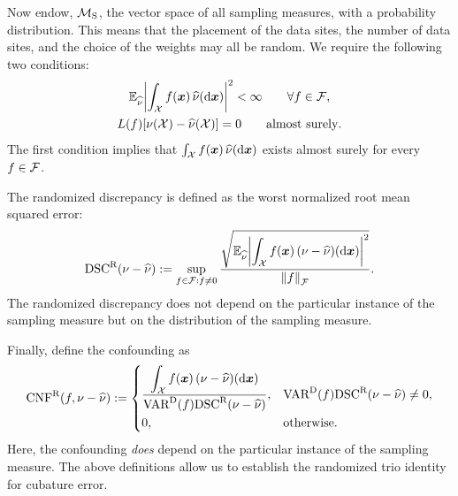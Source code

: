 \documentclass[graybox,footinfo]{svmult}
\begin{document}
Now endow, ${\mathcal{M}}_{\textup{S}}$, the vector space of all sampling measures, with a 
probability distribution.  This means that the placement of the data sites, the number of 
data sites, and the choice of the weights may all be random.  We require  
the following two conditions:
\begin{subequations} \label{FJH:eq:randMcond}
\begin{gather}
\bbE_{\hnu} \biggabs{\int_{\calX} f(\bsx) \,  \hnu(\D \bsx)}^2 < \infty \qquad \forall f \in 
\calF, 
\\
\label{FJH:eq:randMcondB}
L(f) [\nu(\calX) - \hnu(\calX)] = 0  \qquad \text{almost surely}.
\end{gather}
\end{subequations}
The first condition implies that $\int_{{\mathcal{X}}} f({\boldsymbol{x}}) \,  \widehat{\nu}(\mathrm{d} {\boldsymbol{x}})$ exists 
almost surely for every $f \in {\mathcal{F}}$.  

The randomized discrepancy is  defined as the worst  normalized root mean squared 
error:
\begin{equation} \label{FJH:eq:rnddiscdef}
\disc^\Rn(\nu - \hnu) : =\sup_{f \in \calF : f \ne 0} \frac{\displaystyle \sqrt{\bbE_{\hnu}
\biggabs{\int_{\calX} 
		f(\bsx) \, (\nu - \hnu)(\D \bsx)}^2}}{\norm{f}_{\calF}}.
\end{equation}
The randomized discrepancy does not depend on the particular instance of the 
sampling measure but on the distribution of the sampling measure. 

Finally, define the confounding as 
\begin{equation} \label{FJH:eq:rndconfdef}
\algn^\Rn(f,\nu - \hnu): =  \begin{cases} \displaystyle 
\frac{\displaystyle\int_{\calX} f(\bsx) \, (\nu - \hnu)(\D 
	\bsx)}{\Var^\Dt(f)\disc^\Rn(\nu - \hnu)},  & 
\Var^\Dt(f)\disc^\Rn(\nu - \hnu) \ne 0, \\[2ex]
0, & \text{otherwise}.
\end{cases}
\end{equation}
Here, the confounding \emph{does} depend on the particular instance of the sampling 
measure.  The above definitions allow us to establish the randomized trio identity for 
cubature 
error.
\end{document}
